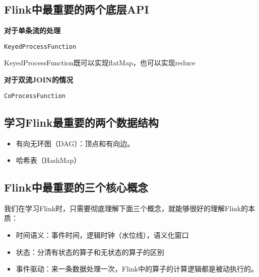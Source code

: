 \hypertarget{flinkux4e2dux6700ux91cdux8981ux7684ux4e24ux4e2aux5e95ux5c42api}{%
\subsection{Flink中最重要的两个底层API}\label{flinkux4e2dux6700ux91cdux8981ux7684ux4e24ux4e2aux5e95ux5c42api}}

\textbf{对于单条流的处理}

\begin{verbatim}
KeyedProcessFunction
\end{verbatim}

KeyedProcessFunction既可以实现flatMap，也可以实现reduce

\textbf{对于双流JOIN的情况}

\begin{verbatim}
CoProcessFunction
\end{verbatim}

\hypertarget{ux5b66ux4e60flinkux6700ux91cdux8981ux7684ux4e24ux4e2aux6570ux636eux7ed3ux6784}{%
\subsection{学习Flink最重要的两个数据结构}\label{ux5b66ux4e60flinkux6700ux91cdux8981ux7684ux4e24ux4e2aux6570ux636eux7ed3ux6784}}

\begin{itemize}
\tightlist
\item
  有向无环图（DAG）：顶点和有向边。
\item
  哈希表（HashMap）
\end{itemize}

\hypertarget{flinkux4e2dux6700ux91cdux8981ux7684ux4e09ux4e2aux6838ux5fc3ux6982ux5ff5}{%
\subsection{Flink中最重要的三个核心概念}\label{flinkux4e2dux6700ux91cdux8981ux7684ux4e09ux4e2aux6838ux5fc3ux6982ux5ff5}}

我们在学习Flink时，只需要彻底理解下面三个概念，就能够很好的理解Flink的本质：

\begin{itemize}
\tightlist
\item
  时间语义：事件时间，逻辑时钟（水位线），语义化窗口
\item
  状态：分清有状态的算子和无状态的算子的区别
\item
  事件驱动：来一条数据处理一次，Flink中的算子的计算逻辑都是被动执行的。
\end{itemize}


